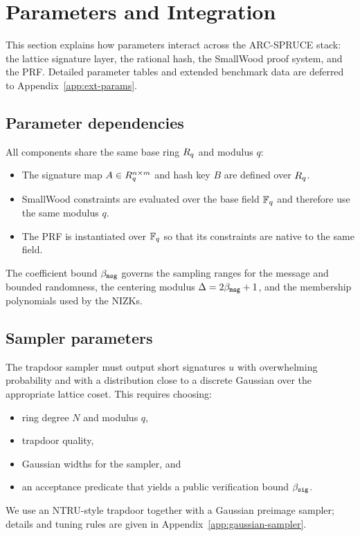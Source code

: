\section{Parameters and Integration}
\label{sec:parameters}

This section explains how parameters interact across the ARC-SPRUCE stack: the lattice signature layer, the rational
hash, the SmallWood proof system, and the PRF. Detailed parameter tables and extended benchmark data are deferred to
Appendix~\ref{app:ext-params}.

\subsection{Parameter dependencies}
All components share the same base ring \(R_q\) and modulus \(q\):
\begin{itemize}[leftmargin=1.25em]
  \item The signature map \(A\in R_q^{n\times m}\) and hash key \(B\) are defined over \(R_q\).
  \item SmallWood constraints are evaluated over the base field \(\mathbb{F}_q\) and therefore use the same modulus \(q\).
  \item The PRF is instantiated over \(\mathbb{F}_q\) so that its constraints are native to the same field.
\end{itemize}
The coefficient bound \(\beta_{\mathtt{msg}}\) governs the sampling ranges for the message and bounded randomness, the centering
modulus \(\Delta=2\beta_{\mathtt{msg}}+1\), and the membership polynomials used by the NIZKs.

\subsection{Sampler parameters}
The trapdoor sampler must output short signatures \(u\) with overwhelming probability and with a distribution close to
a discrete Gaussian over the appropriate lattice coset. This requires choosing:
\begin{itemize}[leftmargin=1.25em]
  \item ring degree \(N\) and modulus \(q\),
  \item trapdoor quality,
  \item Gaussian widths for the sampler, and
  \item an acceptance predicate that yields a public verification bound \(\beta_{\mathtt{sig}}\).
\end{itemize}
We use an NTRU-style trapdoor together with a Gaussian preimage sampler; details and tuning rules are given in
Appendix~\ref{app:gaussian-sampler}.

